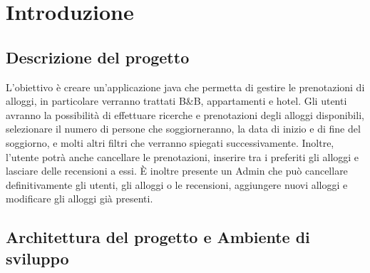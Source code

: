 \documentclass[10pt]{article}
\begin{document}
\newpage

\tableofcontents

\newpage

\section{Introduzione}

\subsection{Descrizione del progetto}

L'obiettivo è creare un'applicazione java che permetta di gestire le prenotazioni di alloggi, in particolare verranno trattati B\&B, appartamenti e hotel. Gli utenti avranno la possibilità di effettuare ricerche e prenotazioni degli alloggi disponibili, selezionare il numero di persone che soggiorneranno, la data di inizio e di fine del soggiorno, e molti altri filtri che verranno spiegati successivamente. Inoltre, l'utente potrà anche cancellare le prenotazioni, inserire tra i preferiti gli alloggi e lasciare delle recensioni a essi. \`E inoltre presente un Admin che può cancellare definitivamente gli utenti,  gli alloggi o le recensioni, aggiungere nuovi alloggi e modificare gli alloggi già presenti.

\subsection{Architettura del progetto e Ambiente di sviluppo}
\end{document}
